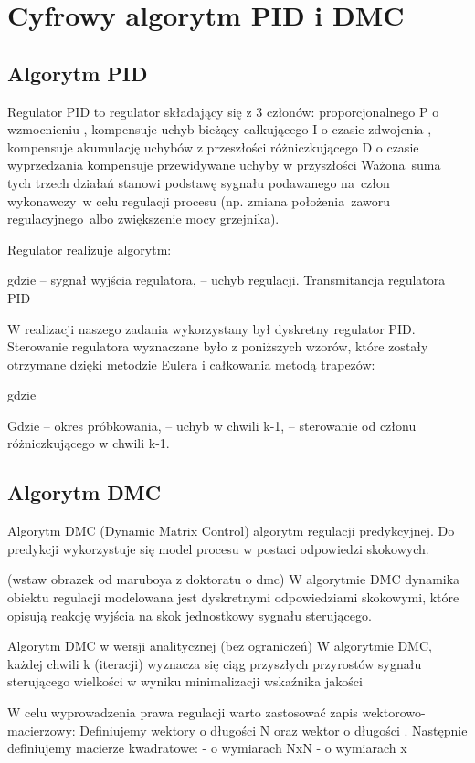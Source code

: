\section{Cyfrowy algorytm PID i DMC}

\subsection{Algorytm PID}

Regulator PID to regulator składający się z 3 członów:
proporcjonalnego P o wzmocnieniu , kompensuje uchyb bieżący
	całkującego I o czasie zdwojenia , kompensuje akumulację uchybów z przeszłości
	różniczkującego D o czasie wyprzedzania  kompensuje przewidywane uchyby w przyszłości
Ważona suma tych trzech działań stanowi podstawę sygnału podawanego na człon wykonawczy w celu regulacji procesu (np. zmiana położenia zaworu regulacyjnego albo zwiększenie mocy grzejnika).

Regulator realizuje algorytm:

gdzie  – sygnał wyjścia regulatora,  – uchyb regulacji.
Transmitancja regulatora PID

W realizacji naszego zadania wykorzystany był dyskretny regulator PID. Sterowanie regulatora wyznaczane było z poniższych wzorów, które zostały otrzymane dzięki metodzie Eulera i całkowania metodą trapezów:

gdzie



Gdzie
  – okres próbkowania,
 – uchyb w chwili k-1,
 – sterowanie od członu różniczkującego w chwili k-1.


\subsection{Algorytm DMC}

Algorytm DMC (Dynamic Matrix Control) algorytm regulacji predykcyjnej. Do predykcji wykorzystuje się model procesu w postaci odpowiedzi skokowych. 
 
(wstaw obrazek od maruboya z doktoratu o dmc)
W algorytmie DMC dynamika obiektu regulacji modelowana jest dyskretnymi odpowiedziami skokowymi, które opisują reakcję wyjścia na skok jednostkowy sygnału sterującego.

Algorytm DMC w wersji analitycznej (bez ograniczeń)
W algorytmie DMC, każdej chwili k (iteracji) wyznacza się ciąg przyszłych przyrostów sygnału sterującego wielkości  w wyniku minimalizacji wskaźnika jakości


W celu wyprowadzenia prawa regulacji warto zastosować zapis wektorowo-macierzowy:
Definiujemy wektory  o długości N oraz wektor  o długości .
Następnie definiujemy macierze kwadratowe:
 - o wymiarach NxN
 - o wymiarach x

